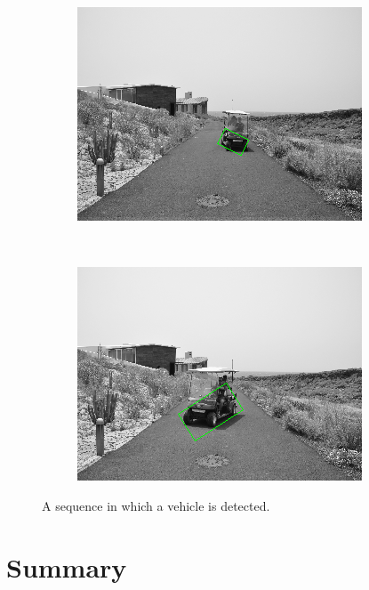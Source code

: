 \begin{figure}[h!]
\begin{subfigure}[b]{0.24\columnwidth}
	    \includegraphics[width=\textwidth]{sequence/seq7}\label{fig:seq7}
        \end{subfigure}%
        ~
        \begin{subfigure}[b]{0.24\columnwidth}
	    \includegraphics[width=\textwidth]{sequence/seq8}\label{fig:seq8}
        \end{subfigure}%
        \caption{A sequence in which a vehicle is detected.}\label{fig:cp01_sequence_example}
\end{figure}

\section{Summary}\label{ch:chapter01_03}

